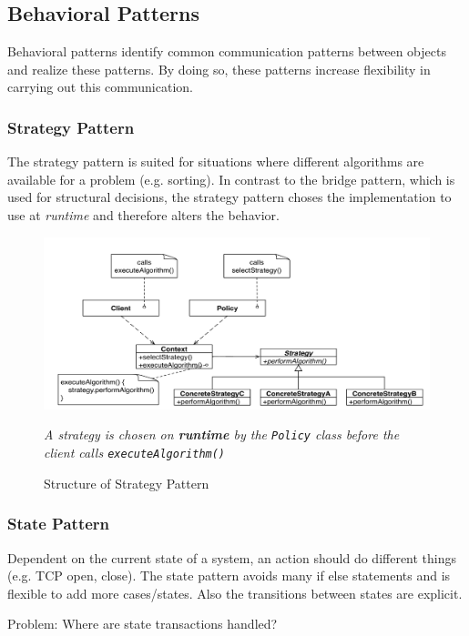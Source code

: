 \subsection{Behavioral Patterns}
Behavioral patterns identify common communication patterns between objects and realize these patterns. By doing so, these patterns increase flexibility in carrying out this communication. %

\subsubsection{Strategy Pattern}
The strategy pattern is suited for situations where different algorithms are available for a problem (e.g. sorting).
In contrast to the bridge pattern, which is used for structural decisions, the strategy pattern choses the implementation to use at \textit{runtime} and therefore alters the behavior.
\begin{figure}[h]
	\centering
	\includegraphics[width=\linewidth]{images/pattern_strategy.png}
	\caption{Structure of Strategy Pattern}{\textit{A strategy is chosen on \textbf{runtime} by the \texttt{Policy} class before the client calls \texttt{executeAlgorithm()}}}
\end{figure}
\newpage

\subsubsection{State Pattern}
Dependent on the current state of a system, an action should do different things (e.g. TCP open, close).
The state pattern avoids many if else statements and is flexible to add more cases/states.
Also the transitions between states are explicit.\newline

Problem: Where are state transactions handled?%
\newline


